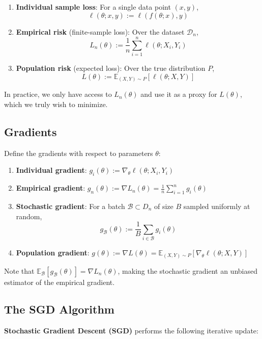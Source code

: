 \documentclass[11pt]{article}
\begin{document}
\begin{enumerate}
    \item \textbf{Individual sample loss}: For a single data point $(x, y)$,
    $$\ell(\theta; x, y) := \ell(f(\theta; x), y)$$
    
    \item \textbf{Empirical risk} (finite-sample loss): Over the dataset $\mathcal{D}_n$,
    $$L_n(\theta) := \frac{1}{n} \sum_{i=1}^n \ell(\theta; X_i, Y_i)$$
    
    \item \textbf{Population risk} (expected loss): Over the true distribution $P$,
    $$L(\theta) := \mathbb{E}_{(X,Y) \sim P}[\ell(\theta; X, Y)]$$
\end{enumerate}

In practice, we only have access to $L_n(\theta)$ and use it as a proxy for $L(\theta)$, which we truly wish to minimize.

\subsection{Gradients}

Define the gradients with respect to parameters $\theta$:

\begin{enumerate}
    \item \textbf{Individual gradient}: $g_i(\theta) := \nabla_\theta \ell(\theta; X_i, Y_i)$
    \item \textbf{Empirical gradient}: $g_n(\theta) := \nabla L_n(\theta) = \frac{1}{n} \sum_{i=1}^n g_i(\theta)$
    \item \textbf{Stochastic gradient}: For a batch $\mathcal{B} \subset D_n$ of size $B$ sampled uniformly at random,
    $$g_{\mathcal{B}}(\theta) := \frac{1}{B} \sum_{i \in \mathcal{B}} g_i(\theta)$$
    \item \textbf{Population gradient}: $g(\theta) := \nabla L(\theta) = \mathbb{E}_{(X,Y) \sim P}[\nabla_\theta \ell(\theta; X, Y)]$
\end{enumerate}

Note that $\mathbb{E}_{\mathcal{B}}[g_{\mathcal{B}}(\theta)] = \nabla L_n(\theta)$, making the stochastic gradient an unbiased estimator of the empirical gradient.

\subsection{The SGD Algorithm}

\textbf{Stochastic Gradient Descent (SGD)} performs the following iterative update:
\end{document}
